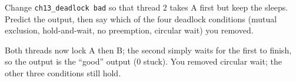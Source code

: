 \begin{exercise}[medium]
Change \texttt{ch13\_deadlock bad} so that thread 2 takes A first
but keep the sleeps. Predict the output, then say which of the four
deadlock conditions (mutual exclusion, hold-and-wait, no preemption,
circular wait) you removed.
\end{exercise}
\begin{solution}[hint]
Both threads now lock A then B; the second simply waits for the first
to finish, so the output is the ``good'' output (0 stuck). You removed
circular wait; the other three conditions still hold.
\end{solution}
